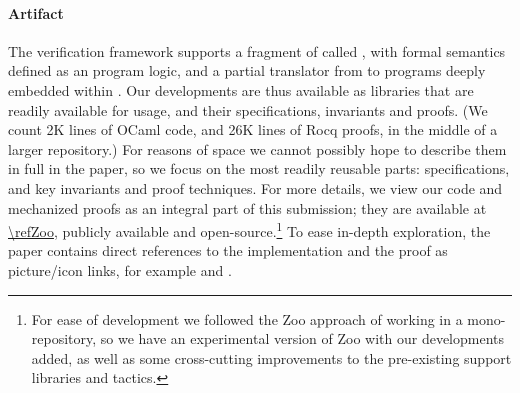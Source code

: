 \paragraph{Artifact} The \Zoo verification framework supports a fragment of \OCaml called \ZooLang, with formal semantics defined as an \Iris program logic, and a partial translator from \OCaml to \ZooLang programs deeply embedded within \Rocq. Our developments are thus available as \OCaml libraries that are readily available for usage, and their \Rocq specifications, invariants and proofs. (We count 2K lines of OCaml code, and 26K lines of Rocq proofs, in the middle of a larger repository.) For reasons of space we cannot possibly hope to describe them in full in the paper, so we focus on the most readily reusable parts: specifications, and key invariants and proof techniques. For more details, we view our code and mechanized proofs as an integral part of this submission; they are available at \url{\refZoo}, publicly available and open-source.\footnote{For ease of development we followed the Zoo approach of working in a mono-repository, so we have an experimental version of Zoo with our developments added, as well as some cross-cutting improvements to the pre-existing support libraries and tactics.} To ease in-depth exploration, the paper contains direct references to the implementation and the proof as picture/icon links, for example  and .

